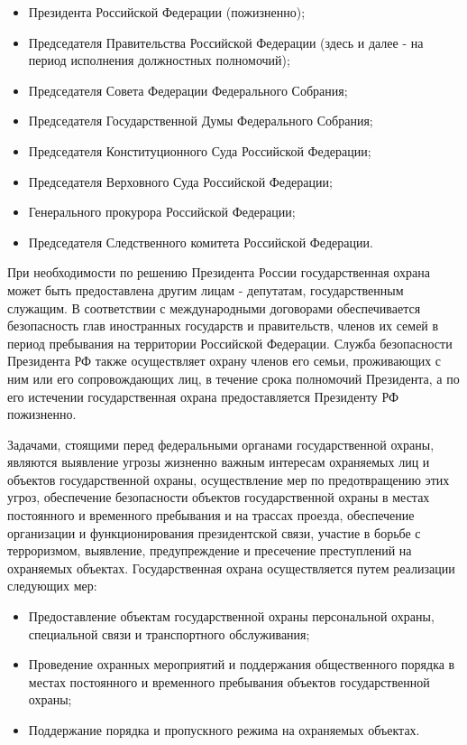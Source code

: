 \documentclass[a4paper,12pt,fleqn]{article} %
\begin{document}
\begin{itemize}
	\item Президента Российской Федерации (пожизненно);
	\item Председателя Правительства Российской Федерации (здесь и далее - на период исполнения должностных полномочий); 
	\item Председателя Совета Федерации Федерального Собрания; 
	\item Председателя Государственной Думы Федерального Собрания; 
	\item Председателя Конституционного Суда Российской Федерации; 
	\item Председателя Верховного Суда Российской Федерации; 
	\item Генерального прокурора Российской Федерации;
	\item Председателя Следственного комитета Российской Федерации.
\end{itemize}

При необходимости по решению Президента России государственная охрана может быть предоставлена другим лицам - депутатам, государственным служащим. В соответствии с международными договорами обеспечивается безопасность глав иностранных государств и правительств, членов их семей в период пребывания на территории Российской Федерации.	Служба безопасности Президента РФ также осуществляет охрану членов его семьи, проживающих с ним или его сопровождающих лиц, в течение срока полномочий Президента, а по его истечении государственная охрана предоставляется Президенту РФ  пожизненно.

Задачами, стоящими перед федеральными органами государственной охраны, являются выявление угрозы жизненно важным интересам охраняемых лиц и объектов государственной охраны, осуществление мер по предотвращению этих угроз, обеспечение безопасности объектов государственной охраны в местах постоянного и временного пребывания и на трассах проезда, обеспечение организации и функционирования президентской связи, участие в борьбе с терроризмом, выявление, предупреждение и пресечение преступлений на охраняемых объектах. Государственная охрана осуществляется путем реализации следующих мер:

\begin{itemize}
	\item Предоставление объектам государственной охраны персональной охраны, специальной связи и транспортного обслуживания;
	\item Проведение охранных мероприятий и поддержания общественного порядка в местах постоянного и временного пребывания объектов государственной охраны;
	\item Поддержание порядка и пропускного режима на охраняемых объектах.
\end{itemize}
\end{document}
